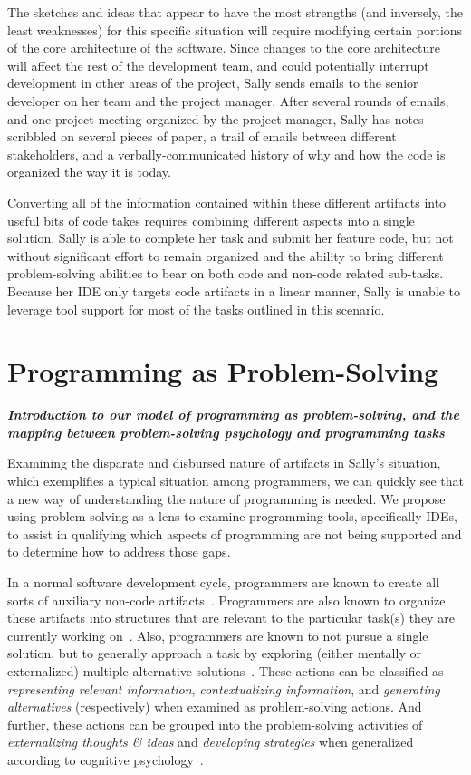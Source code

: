 \documentclass{ppig}
\newcommand{\bold}[1]{\textit{\textbf{\color{aoblue}#1}}}
\begin{document}
The sketches and ideas that appear to have the most strengths (and inversely, the least weaknesses) for this specific situation will require modifying certain portions of the core architecture of the software.
Since changes to the core architecture will affect the rest of the development team, and could potentially interrupt development in other areas of the project, Sally sends emails to the senior developer on her team and the project manager.
After several rounds of emails, and one project meeting organized by the project manager, Sally has notes scribbled on several pieces of paper, a trail of emails between different stakeholders, and a verbally-communicated history of why and how the code is organized the way it is today.

Converting all of the information contained within these different artifacts into useful bits of code takes requires combining different aspects into a single solution.
Sally is able to complete her task and submit her feature code, but not without significant effort to remain organized and the ability to bring different problem-solving abilities to bear on both code and non-code related sub-tasks.
Because her IDE only targets code artifacts in a linear manner, Sally is unable to leverage tool support for most of the tasks outlined in this scenario.

\section{Programming as Problem-Solving}

\bold{Introduction to our model of programming as problem-solving, and the mapping between problem-solving psychology and programming tasks\\}

Examining the disparate and disbursed nature of artifacts in Sally's situation, which exemplifies a typical situation among programmers, we can quickly see that a new way of understanding the nature of programming is needed.
We propose using problem-solving as a lens to examine programming tools, specifically IDEs, to assist in qualifying which aspects of programming are not being supported and to determine how to address those gaps.

In a normal software development cycle, programmers are known to create all sorts of auxiliary non-code artifacts~\cite{cherubini2007whiteboard}.
Programmers are also known to organize these artifacts into structures that are relevant to the particular task(s) they are currently working on~\cite{baltes2016empirical}.
Also, programmers are known to not pursue a single solution, but to generally approach a task by exploring (either mentally or externalized) multiple alternative solutions~\cite{madeyski2017experimentation}.
These actions can be classified as \textit{representing relevant information}, \textit{contextualizing information}, and \textit{generating alternatives} (respectively) when examined as problem-solving actions.
And further, these actions can be grouped into the problem-solving activities of \textit{externalizing thoughts \& ideas} and \textit{developing strategies} when generalized according to cognitive psychology~\cite{mayer1992thinking}.
\end{document}
